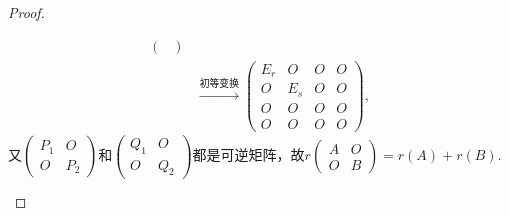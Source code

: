 \begin{enumerate}
\begin{proof}
\begin{enumerate}
\begin{align*}
\begin{pmatrix}
                                \end{pmatrix}            \\
                             & \xrightarrow{\text{初等变换}}
                            \begin{pmatrix}
                                E_r & O   & O & O \\
                                O   & E_s & O & O \\
                                O   & O   & O & O \\
                                O   & O   & O & O
                            \end{pmatrix},
                        \end{align*}
                        又$\begin{pmatrix}
                                P_1 & O \\ O & P_2
                            \end{pmatrix}$和$\begin{pmatrix}
                                Q_1 & O \\ O & Q_2
                            \end{pmatrix}$都是可逆矩阵，故$r\begin{pmatrix}
                                A & O \\ O & B
                            \end{pmatrix}=r(A)+r(B)$.


\end{enumerate}
\end{proof}
\end{enumerate}
